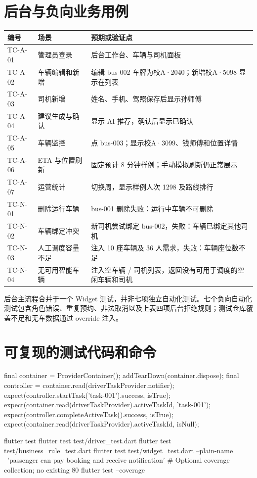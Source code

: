 \documentclass[UTF8,fontset=fandol,zihao=-4,oneside]{ctexrep}
\begin{document}
\section{后台与负向业务用例}
\begin{longtable}{p{2cm}p{4.2cm}p{8.5cm}}
\toprule 编号 & 场景 & 预期或验证点 \\ \midrule
TC-A-01 & 管理员登录 & 后台工作台、车辆与司机面板 \\
TC-A-02 & 车辆编辑和新增 & 编辑 bus-002 车牌为校A·2040；新增校A·5098 显示在列表 \\
TC-A-03 & 司机新增 & 姓名、手机、驾照保存后显示孙师傅 \\
TC-A-04 & 建议生成与确认 & 显示 AI 推荐，确认后显示已确认 \\
TC-A-05 & 车辆监控 & 点 bus-003；显示校A·3099、钱师傅和位置详情 \\
TC-A-06 & ETA 与位置刷新 & 固定预计 8 分钟样例；手动模拟刷新仍正常展示 \\
TC-A-07 & 运营统计 & 切换周，显示样例人次 1298 及路线排行 \\
TC-N-01 & 删除运行车辆 & bus-001 删除失败：运行中车辆不可删除 \\
TC-N-02 & 车辆绑定冲突 & 新司机尝试绑定 bus-002，失败：车辆已绑定其他司机 \\
TC-N-03 & 人工调度容量不足 & 注入 10 座车辆及 36 人需求，失败：车辆座位数不足 \\
TC-N-04 & 无可用智能车辆 & 注入空车辆 / 司机列表，返回没有可用于调度的空闲车辆和司机 \\
\bottomrule
\end{longtable}
后台主流程合并于一个 Widget 测试，并非七项独立自动化测试。七个负向自动化测试包含角色错误、重复预约、非法取消以及上表四项后台拒绝规则；测试仓库覆盖不足和无车数据通过 override 注入。

\section{可复现的测试代码和命令}
\begin{code}
final container = ProviderContainer();
addTearDown(container.dispose);
final controller = container.read(driverTaskProvider.notifier);
expect(controller.startTask('task-001').success, isTrue);
expect(container.read(driverTaskProvider).activeTaskId, 'task-001');
expect(controller.completeActiveTask().success, isTrue);
expect(container.read(driverTaskProvider).activeTaskId, isNull);
\end{code}
\begin{code}
flutter test
flutter test test/driver_test.dart
flutter test test/business_rule_test.dart
flutter test test/widget_test.dart --plain-name \
  'passenger can pay booking and receive notification'
# Optional coverage collection; no existing 80%
flutter test --coverage
\end{code}
\end{document}
